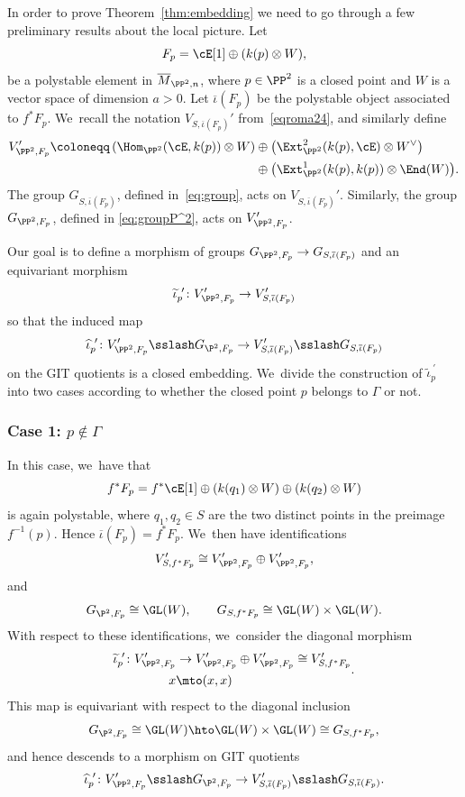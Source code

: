 In order to prove Theorem~\ref{thm:embedding} we need to go through a few preliminary results about the local picture.
Let
\[
F_p = \cE[1] \oplus(k(p)\otimes W),
\]
be a polystable element in $\overline{M}_{\PP^2,n}$, where $p\in \PP^2$ is a closed point and $W$ is a vector space of dimension $a>0$.
Let $\overline{\iota}(F_p)$ be the polystable object associated to $f^*F_p$. We~recall the notation $V_{S,\overline{\iota}(F_p)}'$ from~\eqref{eqroma24}, and similarly define
\begin{equation}\label{eq:VPprime}
\begin{split}
V_{\PP^2,F_p}' \coloneqq \left(\Hom_{\PP^2}(\cE,k(p))\otimes W\right) &\oplus \bigl(\Ext^2_{\PP^2}(k(p),\cE)\otimes W^\vee\bigr)\\
&\oplus \bigl(\Ext^1_{\PP^2}(k(p),k(p))\otimes \End(W)\bigr).
\end{split}
\end{equation}
The group $G_{S,\overline{\iota}(F_p)}$, defined in~\eqref{eq:group}, acts on $V_{S,\overline{\iota}(F_p)}'$. Similarly, the group $G_{\PP^2,F_p}$, defined in \eqref{eq:groupP^2}, acts on $V_{\PP^2,F_p}'$.

Our goal is to define a morphism of groups $G_{\PP^2,F_p}\to G_{S,\overline{\iota}(F_p)}$ and an equivariant morphism
\[
\widetilde{\iota}_p^{\ \prime}\colon V_{\PP^2,F_p}'\to V_{S,\overline{\iota}(F_p)}'
\]
so that the induced map
\[
\widehat{\iota}_p^{\ \prime}\colon V_{\PP^2,F_p}'\sslash G_{\P^2,F_p} \to V_{S,\overline{\iota}(F_p)}'\sslash G_{S,\overline{\iota}(F_p)}
\]
on the GIT quotients is a closed embedding. We~divide the construction of $\widetilde{\iota}_p^{\ \prime}$ into two cases according to whether the closed point $p$ belongs to $\mathsf{\Gamma}$ or not.

\subsubsection*{Case 1: $p\not\in\mathsf{\Gamma}$}
In this case, we~have that
\[
f^*F_p=f^*\cE [1] \oplus \left(k(q_1)\otimes W \right) \oplus \left(k(q_2)\otimes W \right)
\]
is again polystable, where $q_1,q_2\in S$ are the two distinct points in the preimage $f^{-1}(p)$. Hence $\overline{\iota}(F_p)=f^*F_p$. We~then have identifications
\[
V_{S,f^*F_p}' \cong V'_{\PP^2,F_p} \oplus V'_{\PP^2,F_p},
\]
and
\[
G_{\P^2,F_p}\cong \GL(W), \qquad G_{S,f^*F_p} \cong \GL(W) \times \GL(W).
\]
With respect to these identifications, we~consider the diagonal morphism
\begin{equation}\label{eq:DefOfIotaTilde}
\begin{aligned}
\widetilde{\iota}_p^{\ \prime}\colon V'_{\PP^2,F_p} & \to V'_{\PP^2,F_p} \oplus V'_{\PP^2,F_p} \cong V_{S,f^*F_p}' \\
\ x & \mto (x,x)
\end{aligned}.
\end{equation}
This map is equivariant with respect to the diagonal inclusion
\[
G_{\P^2,F_p}\cong \GL(W) \hto \GL(W) \times \GL(W) \cong G_{S,f^*F_p},
\]
and hence descends to a morphism on GIT quotients
\[
\widehat{\iota}_p^{\ \prime} \colon V_{\PP^2,F_p}'\sslash G_{\P^2,F_p} \to V_{S,\overline{\iota}(F_p)}'\sslash G_{S,\overline{\iota}(F_p)}.
\]


